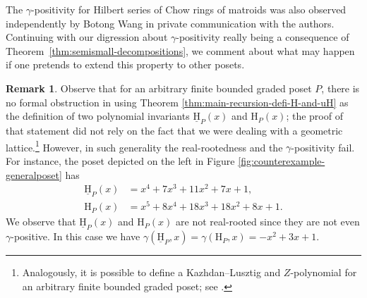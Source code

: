 \documentclass[11pt, a4paper, english]{amsart}
\theoremstyle{teoremas}
\theoremstyle{definition}
\newtheorem{remark}[theorem]{Remark}
\renewcommand{\H}{\mathrm{H}}
\newcommand{\uH}{\underline{\mathrm{H}}}
\begin{document}
The $\gamma$-positivity for Hilbert series of Chow rings of matroids was also observed independently by Botong Wang in private communication with the authors. Continuing with our digression about $\gamma$-positivity really being a consequence of Theorem~\ref{thm:semismall-decompositions}, we comment about what may happen if one pretends to extend this property to other posets.

\begin{remark}
    Observe that for an arbitrary finite bounded graded poset $P$, there is no formal obstruction in using Theorem \ref{thm:main-recursion-defi-H-and-uH} as the definition of two polynomial invariants $\uH_{P}(x)$ and $\H_P(x)$; the proof of that statement did not rely on the fact that we were dealing with a geometric lattice.\footnote{Analogously, it is possible to define a Kazhdan--Lusztig and $Z$-polynomial for an arbitrary finite bounded graded poset; see \cite[Example~2.13]{proudfoot-kls}.} However, in such generality the real-rootedness and the $\gamma$-positivity fail. For instance, the poset depicted on the left in Figure \ref{fig:counterexample-generalposet} has
    \begin{align*}
        \uH_P(x) &= x^4+7x^3+11x^2+7x+1,\\ 
        \H_P(x) &= x^5+8x^4+18x^3+18x^2+8x+1.
    \end{align*}
    We observe that $\uH_{P}(x)$ and $\H_P(x)$ are not real-rooted since they are not even $\gamma$-positive. In this case we have $\gamma(\uH_P,x) = \gamma(\H_P,x)=-x^2+3x+1$. 

\begin{figure}[ht]
    \centering
	\qquad\qquad\qquad{}
\end{figure}
\end{remark}
\end{document}
